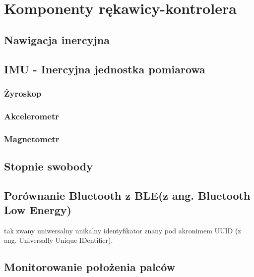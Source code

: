 \chapter{Komponenty rękawicy-kontrolera}
\label{ch:komponenty}

	\section{Nawigacja inercyjna}
	\label{sec:inercja}

	
	
	\section{IMU - Inercyjna jednostka pomiarowa}
	\label{sec:imu}
	
		\subsection{Żyroskop}
		\label{subsec:gyro}
		
		\subsection{Akcelerometr}
		\label{subsec:acc}
		
		\subsection{Magnetometr}
		\label{subsec:mag}
	
	\section{Stopnie swobody}
	\label{sec:swobody}	
	
\section{Porównanie Bluetooth z BLE(z ang. Bluetooth Low Energy)}
\label{sec:bvsble}
tak zwany uniwersalny unikalny identyfikator znany pod akronimem UUID (z ang. Universally Unique IDentifier). 
	
	\section{Monitorowanie położenia palców}
	\label{sec:palce}
	